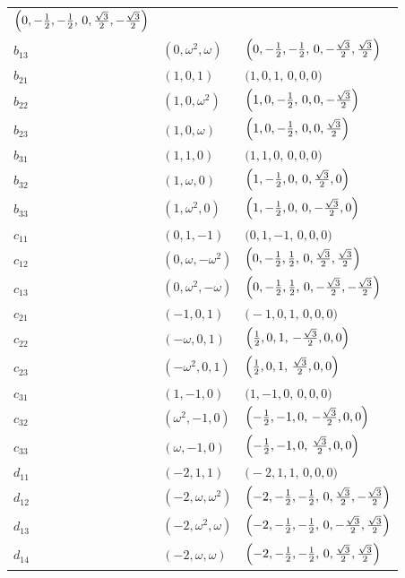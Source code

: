 \documentclass[%
  reprint,
  superscriptaddress,
  amsmath,amssymb,
  pra,
  floatfix,
  longbibliography
]{revtex4-2}
\begin{document}
\begin{longtable}{lll}
$\Bigl(0,-\tfrac12,-\tfrac12,\,0,\tfrac{\sqrt{3}}{2},-\tfrac{\sqrt{3}}{2}\Bigr)$ \\
$b_{13}$ & $(0,\omega^2,\omega)$ &
$\Bigl(0,-\tfrac12,-\tfrac12,\,0,-\tfrac{\sqrt{3}}{2},\tfrac{\sqrt{3}}{2}\Bigr)$ \\
$b_{21}$ & $(1,0,1)$ &
$\bigl(1,0,1,\,0,0,0\bigr)$ \\
$b_{22}$ & $(1,0,\omega^2)$ &
$\Bigl(1,0,-\tfrac12,\,0,0,-\tfrac{\sqrt{3}}{2}\Bigr)$ \\
$b_{23}$ & $(1,0,\omega)$ &
$\Bigl(1,0,-\tfrac12,\,0,0,\tfrac{\sqrt{3}}{2}\Bigr)$ \\
$b_{31}$ & $(1,1,0)$ &
$\bigl(1,1,0,\,0,0,0\bigr)$ \\
$b_{32}$ & $(1,\omega,0)$ &
$\Bigl(1,-\tfrac12,0,\,0,\tfrac{\sqrt{3}}{2},0\Bigr)$ \\
$b_{33}$ & $(1,\omega^2,0)$ &
$\Bigl(1,-\tfrac12,0,\,0,-\tfrac{\sqrt{3}}{2},0\Bigr)$ \\
$c_{11}$ & $(0,1,-1)$ &
$\bigl(0,1,-1,\,0,0,0\bigr)$ \\
$c_{12}$ & $(0,\omega,-\omega^2)$ &
$\Bigl(0,-\tfrac12,\tfrac12,\,0,\tfrac{\sqrt{3}}{2},\tfrac{\sqrt{3}}{2}\Bigr)$ \\
$c_{13}$ & $(0,\omega^2,-\omega)$ &
$\Bigl(0,-\tfrac12,\tfrac12,\,0,-\tfrac{\sqrt{3}}{2},-\tfrac{\sqrt{3}}{2}\Bigr)$ \\
$c_{21}$ & $(-1,0,1)$ &
$\bigl(-1,0,1,\,0,0,0\bigr)$ \\
$c_{22}$ & $(-\omega,0,1)$ &
$\Bigl(\tfrac12,0,1,\,-\tfrac{\sqrt{3}}{2},0,0\Bigr)$ \\
$c_{23}$ & $(-\omega^2,0,1)$ &
$\Bigl(\tfrac12,0,1,\,\tfrac{\sqrt{3}}{2},0,0\Bigr)$ \\
$c_{31}$ & $(1,-1,0)$ &
$\bigl(1,-1,0,\,0,0,0\bigr)$ \\
$c_{32}$ & $(\omega^2,-1,0)$ &
$\Bigl(-\tfrac12,-1,0,\,-\tfrac{\sqrt{3}}{2},0,0\Bigr)$ \\
$c_{33}$ & $(\omega,-1,0)$ &
$\Bigl(-\tfrac12,-1,0,\,\tfrac{\sqrt{3}}{2},0,0\Bigr)$ \\
$d_{11}$ & $(-2,1,1)$ &
$\bigl(-2,1,1,\,0,0,0\bigr)$ \\
$d_{12}$ & $(-2,\omega,\omega^2)$ &
$\Bigl(-2,-\tfrac12,-\tfrac12,\,0,\tfrac{\sqrt{3}}{2},-\tfrac{\sqrt{3}}{2}\Bigr)$ \\
$d_{13}$ & $(-2,\omega^2,\omega)$ &
$\Bigl(-2,-\tfrac12,-\tfrac12,\,0,-\tfrac{\sqrt{3}}{2},\tfrac{\sqrt{3}}{2}\Bigr)$ \\
$d_{14}$ & $(-2,\omega,\omega)$ &
$\Bigl(-2,-\tfrac12,-\tfrac12,\,0,\tfrac{\sqrt{3}}{2},\tfrac{\sqrt{3}}{2}\Bigr)$ \\

\end{longtable}
\end{document}
